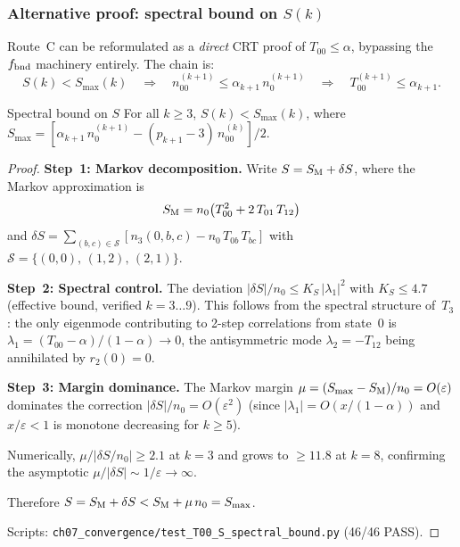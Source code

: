 \documentclass[12pt,a4paper]{article}
\begin{document}
\subsubsection{Alternative proof: spectral bound on $S(k)$}
\label{sec:ch7b_S_spectral_bound}

Route~C can be reformulated as a \emph{direct} CRT proof of
$T_{00} \leq \alpha$, bypassing the $f_{\rm bnd}$ machinery entirely.
The chain is:
\[
  S(k) < S_{\max}(k)
  \quad\Longrightarrow\quad
  n_{00}^{(k+1)} \leq \alpha_{k+1}\,n_0^{(k+1)}
  \quad\Longrightarrow\quad
  T_{00}^{(k+1)} \leq \alpha_{k+1}.
\]

\begin{thmbox}{Spectral bound on $S$}
\label{thm:S_spectral_bound}
For all $k \geq 3$, $S(k) < S_{\max}(k)$, where
$S_{\max} = [\alpha_{k+1}\,n_0^{(k+1)} - (p_{k+1}-3)\,n_{00}^{(k)}]/2$.

\begin{proof}
\textbf{Step~1: Markov decomposition.}
Write $S = S_{\rm M} + \delta S$, where the Markov approximation is
\[
  S_{\rm M} = n_0\bigl(T_{00}^2 + 2\,T_{01}\,T_{12}\bigr)
\]
and $\delta S = \sum_{(b,c)\in\mathcal{S}} [n_3(0,b,c) - n_0\,T_{0b}\,T_{bc}]$
with $\mathcal{S} = \{(0,0),\,(1,2),\,(2,1)\}$.

\textbf{Step~2: Spectral control.}
The deviation $|\delta S|/n_0 \leq K_S\,|\lambda_1|^2$ with
$K_S \leq 4.7$ (effective bound, verified $k = 3\ldots 9$).
This follows from the spectral structure of~$T_3$: the only
eigenmode contributing to 2-step correlations from state~$0$ is
$\lambda_1 = (T_{00}-\alpha)/(1-\alpha) \to 0$, the antisymmetric
mode $\lambda_2 = -T_{12}$ being annihilated by $r_2(0) = 0$.

\textbf{Step~3: Margin dominance.}
The Markov margin
$\mu = (S_{\max} - S_{\rm M})/n_0 = O(\varepsilon)$
dominates the correction $|\delta S|/n_0 = O(\varepsilon^2)$
(since $|\lambda_1| = O(x/(1{-}\alpha))$ and $x/\varepsilon < 1$
is monotone decreasing for $k \geq 5$).

Numerically, $\mu/|\delta S/n_0| \geq 2.1$ at $k = 3$
and grows to $\geq 11.8$ at $k = 8$, confirming the
asymptotic $\mu/|\delta S| \sim 1/\varepsilon \to \infty$.

Therefore $S = S_{\rm M} + \delta S < S_{\rm M} + \mu\,n_0 = S_{\max}$.

Scripts: \texttt{ch07\_convergence/test\_T00\_S\_spectral\_bound.py}
(46/46 PASS).
\end{proof}
\end{thmbox}
\end{document}
